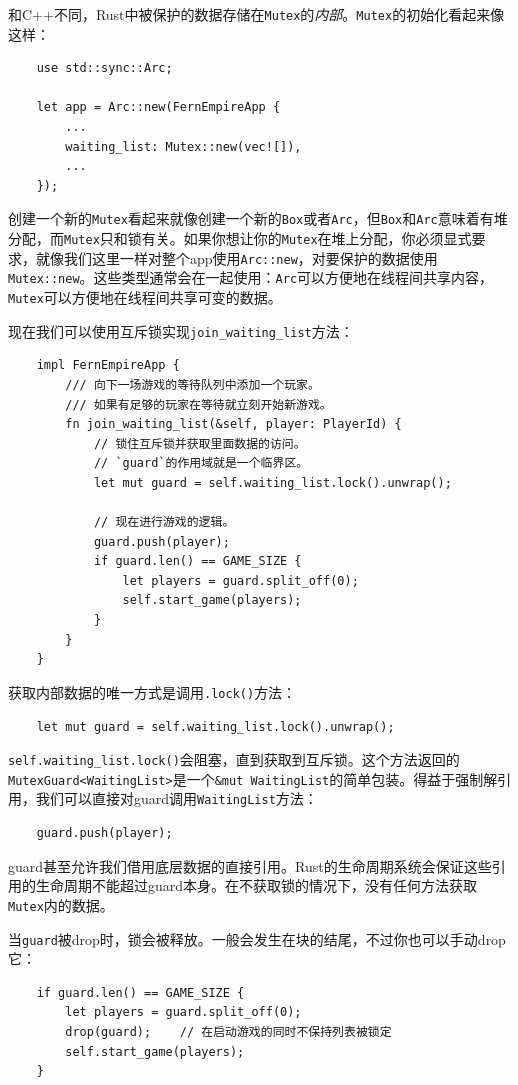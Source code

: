 和C++不同，Rust中被保护的数据存储在\texttt{Mutex}的\emph{内部}。\texttt{Mutex}的初始化看起来像这样：
\begin{verbatim}
    use std::sync::Arc;

    let app = Arc::new(FernEmpireApp {
        ...
        waiting_list: Mutex::new(vec![]),
        ...
    });
\end{verbatim}

创建一个新的\texttt{Mutex}看起来就像创建一个新的\texttt{Box}或者\texttt{Arc}，但\texttt{Box}和\texttt{Arc}意味着有堆分配，而\texttt{Mutex}只和锁有关。如果你想让你的\texttt{Mutex}在堆上分配，你必须显式要求，就像我们这里一样对整个app使用\texttt{Arc::new}，对要保护的数据使用\texttt{Mutex::new}。这些类型通常会在一起使用：\texttt{Arc}可以方便地在线程间共享内容，\texttt{Mutex}可以方便地在线程间共享可变的数据。

现在我们可以使用互斥锁实现\texttt{join\_waiting\_list}方法：
\begin{verbatim}
    impl FernEmpireApp {
        /// 向下一场游戏的等待队列中添加一个玩家。
        /// 如果有足够的玩家在等待就立刻开始新游戏。
        fn join_waiting_list(&self, player: PlayerId) {
            // 锁住互斥锁并获取里面数据的访问。
            // `guard`的作用域就是一个临界区。
            let mut guard = self.waiting_list.lock().unwrap();

            // 现在进行游戏的逻辑。
            guard.push(player);
            if guard.len() == GAME_SIZE {
                let players = guard.split_off(0);
                self.start_game(players);
            }
        }
    }
\end{verbatim}

获取内部数据的唯一方式是调用\texttt{.lock()}方法：
\begin{verbatim}
    let mut guard = self.waiting_list.lock().unwrap();
\end{verbatim}

\texttt{self.waiting\_list.lock()}会阻塞，直到获取到互斥锁。这个方法返回的\texttt{MutexGuard<WaitingList>}是一个\texttt{\&mut WaitingList}的简单包装。得益于强制解引用，我们可以直接对guard调用\texttt{WaitingList}方法：
\begin{verbatim}
    guard.push(player);
\end{verbatim}

guard甚至允许我们借用底层数据的直接引用。Rust的生命周期系统会保证这些引用的生命周期不能超过guard本身。在不获取锁的情况下，没有任何方法获取\texttt{Mutex}内的数据。

当\texttt{guard}被drop时，锁会被释放。一般会发生在块的结尾，不过你也可以手动drop它：
\begin{verbatim}
    if guard.len() == GAME_SIZE {
        let players = guard.split_off(0);
        drop(guard);    // 在启动游戏的同时不保持列表被锁定
        self.start_game(players);
    }
\end{verbatim}

